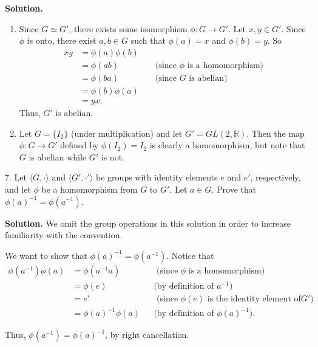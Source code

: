 \documentclass[10pt,]{book}
\theoremstyle{plain}
\theoremstyle{definition}
\theoremstyle{definition}
\theoremstyle{definition}
\theoremstyle{definition}
\numberwithin{equation}{section}
\def\R{\mathbb{R}}
\newcommand{\amp}{&}
\begin{document}
\begin{exerciselist}
\noindent\textbf{Solution.}\hypertarget{solution-26}{}\quad
\leavevmode%
\begin{enumerate}[label=(\alph*)]
\item\hypertarget{li-188}{}Since \(G\simeq G'\), there exists some isomorphism \(\phi:G\to G'\).  Let \(x,y\in G'\).  Since \(\phi\) is onto, there exist \(a,b\in G\) such that \(\phi(a)=x\) and \(\phi(b)=y\).  So%
\begin{align*}
xy\amp =\phi(a)\phi(b)\amp \amp\\
\amp =\phi(ab)\amp \amp \text{ (since \(\phi\) is a homomorphism) }\\
\amp =\phi(ba) \amp \amp \text{ (since \(G\) is abelian) }\\
\amp =\phi(b)\phi(a)\\
\amp =yx.
\end{align*}
Thus, \(G'\) is abelian.%
\item\hypertarget{li-189}{}Let \(G=\{I_2\}\) (under multiplication) and let \(G'=GL(2,\R)\). Then the map \(\phi: G\to G'\) defined by \(\phi(I_2)=I_2\) is clearly a homomorphism, but note that \(G\) is abelian while \(G'\) is not.%
\end{enumerate}
%
\item[7.]\hypertarget{exercise-27}{}Let \(\langle G,\cdot\rangle\) and \(\langle G',\cdot'\rangle\) be groups with identity elements \(e\) and \(e'\), respectively, and let \(\phi\) be a homomorphism from \(G\) to \(G'\). Let \(a\in G\). Prove that \(\phi(a)^{-1}=\phi(a^{-1})\).%
\par\smallskip
\par\smallskip
\noindent\textbf{Solution.}\hypertarget{solution-27}{}\quad
We omit the group operations in this solution in order to increase familiarity with the convention.%
\par
We want to show that \(\phi(a)^{-1}=\phi(a^{-1})\). Notice that%
\begin{align*}
\phi(a^{-1})\phi(a)\amp =\phi(a^{-1}a)\amp \amp \text{ (since \(\phi\) is a homomorphism) }\\
\amp =\phi(e)\amp \amp \text{(by definition of \(a^{-1}\))}\\
\amp =e'\amp \amp  \text{ (since \(\phi(e)\) is the identity element of
\(G'\)) }\\
\amp =\phi(a)^{-1}\phi(a)\amp \amp \text{(by definition of \(\phi(a)^{-1}\))} .
\end{align*}
%
\par
Thus, \(\phi(a^{-1})=\phi(a)^{-1}\), by right cancellation.%
\end{exerciselist}
\typeout{************************************************}
\typeout{************************************************}
\end{document}

